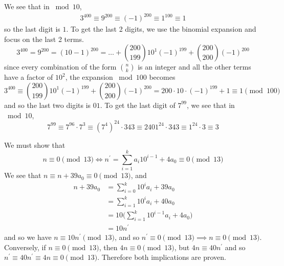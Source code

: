   \begin{exercise}[Shifrin 1.3.8] 
    We see that in $\bmod{10}$, 
    \begin{align}
      3^{400} \equiv 9^{200} \equiv (-1)^{200} \equiv 1^{100} \equiv 1
    \end{align} 
    so the last digit is $1$. To get the last 2 digits, we use the binomial expansion and focus on the last 2 terms. 
    \begin{equation}
      3^{400} = 9^{200} = (10 - 1)^{200} = \ldots + \binom{200}{199} 10^1 (-1)^{199} + \binom{200}{200} (-1)^{200} 
    \end{equation}
    since every combination of the form $\binom{n}{k}$ is an integer and all the other terms have a factor of $10^2$, the expansion $\bmod{100}$ becomes 
    \begin{equation}
      3^{400} \equiv \binom{200}{199} 10^1 (-1)^{199} + \binom{200}{200} (-1)^{200} = 200 \cdot 10 \cdot (-1)^{199} + 1 \equiv 1 \pmod{100}
    \end{equation}
    and so the last two digits is $01$. To get the last digit of $7^{99}$, we see that in $\bmod{10}$, 
    \begin{equation}
      7^{99} \equiv 7^{96} \cdot 7^3 \equiv (7^4)^{24} \cdot 343 \equiv 2401^{24} \cdot 343 \equiv 1^{24} \cdot 3 \equiv 3
    \end{equation}
  \end{exercise}

  \begin{exercise}[Shifrin 1.3.10]
    We must show that 
    \begin{equation}
      n \equiv 0 \pmod{13} \iff n^\prime = \sum_{i=1}^k a_i 10^{i-1} + 4a_0 \equiv 0 \pmod{13}
    \end{equation} 
    We see that $n \equiv n + 39 a_0 \equiv 0 \pmod{13}$, and 
    \begin{align}
      n + 39 a_0 & = \sum_{i=0}^k 10^i a_i + 39 a_0 \\
                 & = \sum_{i=1}^k 10^i a_i + 40 a_0 \\
                 & = 10 \bigg( \sum_{i=1}^k 10^{i-1} a_i + 4 a_0 \bigg) \\
                 & = 10 n^\prime
    \end{align} 
    and so we have $n \equiv 10 n^\prime \pmod{13}$, and so $n^\prime \equiv 0 \pmod{13} \implies n \equiv 0 \pmod{13}$. Conversely, if $n \equiv 0 \pmod{13}$, then $4n \equiv 0 \pmod{13}$, but $4n \equiv 40 n^\prime$ and so $n^\prime \equiv 40 n^\prime \equiv 4n \equiv 0 \pmod{13}$. Therefore both implications are proven. 
  \end{exercise}

